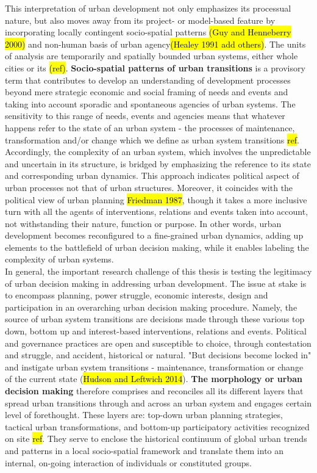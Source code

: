 \documentclass[11pt]{report}
\begin{document}
This interpretation of urban development not only emphasizes its processual nature, but also moves away from its project- or model-based feature by incorporating locally contingent socio-spatial patterns \hl{(Guy and Henneberry 2000)} and non-human basis of urban agency\hl{(Healey 1991 add others)}. The units of analysis are temporarily and spatially bounded urban systems, either whole cities or its  \hl{(ref)}. \textbf{Socio-spatial patterns of urban transitions} is a provisory term  that contributes to develop an understanding of development processes beyond mere strategic economic and social framing of needs and events and taking into account sporadic and spontaneous agencies of urban systems. The sensitivity to this range of needs, events and agencies means that whatever happens refer to the state of an urban system - the processes of maintenance, transformation and/or change which we define as urban system transitions \hl{ref}. Accordingly, the complexity of an urban system, which involves the unpredictable and uncertain in its structure, is bridged by emphasizing the reference to its state and corresponding urban dynamics. This approach indicates political aspect of urban processes not that of urban structures. Moreover, it coincides with the political view of urban planning \hl{Friedman 1987}, though it takes a more inclusive turn with all the agents of interventions, relations and events taken into account, not withstanding their nature, function or purpose. In other words, urban development becomes reconfigured to a fine-grained urban dynamics, adding up elements to the battlefield of urban decision making, while it enables labeling the complexity of urban systems.
\\
In general, the important research challenge of this thesis is testing the legitimacy of urban decision making in addressing urban development. The issue at stake is to encompass planning, power struggle, economic interests, design and participation in an overarching urban decision making procedure. Namely, the source of urban system transitions are decisions made through these various top down, bottom up and interest-based interventions, relations and events. Political and governance practices are open and susceptible to choice, through contestation and struggle, and accident, historical or natural. "But decisions become locked in" and instigate urban system transitions - maintenance, transformation or change of the current state (\hl{Hudson and Leftwich 2014}). \textbf{The morphology or urban decision making} therefore comprises and reconciles all its different layers that spread urban transitions through and across an urban system and engages certain level of forethought. These layers are: top-down urban planning strategies, tactical urban transformations, and bottom-up participatory activities recognized on site \hl{ref}. They serve to enclose the historical continuum of global urban trends and patterns in a local socio-spatial framework and translate them into an internal, on-going interaction of individuals or constituted groups.
\end{document}
